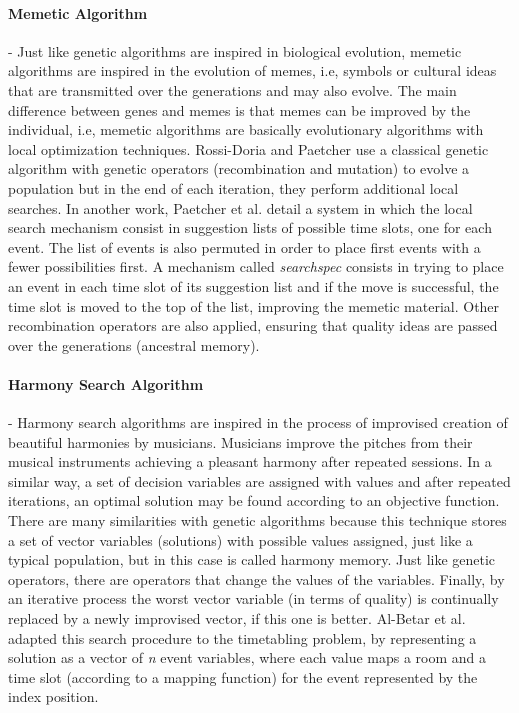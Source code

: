 \paragraph{\textbf{Memetic Algorithm}} - Just like genetic algorithms are inspired in biological evolution, memetic algorithms are inspired in the evolution of memes, i.e, symbols or cultural ideas that are transmitted over the generations and may also evolve. The main difference between genes and memes is that memes can be improved by the individual, i.e, memetic algorithms are basically evolutionary algorithms with local optimization techniques. Rossi-Doria and Paetcher \citep{rossi2004memetic} use a classical genetic algorithm with genetic operators (recombination and mutation) to evolve a population but in the end of each iteration, they perform additional local searches. In another work, Paetcher et al. \citep{paechter1996extensions} detail a system in which the local search mechanism consist in suggestion lists of possible time slots, one for each event. The list of events is also permuted in order to place first events with a fewer possibilities first. A mechanism called \textit{searchspec} consists in trying to place an event in each time slot of its suggestion list and if the move is successful, the time slot is moved to the top of the list, improving the memetic material. Other recombination operators are also applied, ensuring that quality ideas are passed over the generations (ancestral memory). 

\paragraph{\textbf{Harmony Search Algorithm}} - Harmony search algorithms are inspired in the process of improvised creation of beautiful harmonies by musicians. Musicians improve the pitches from their musical instruments achieving a pleasant harmony after repeated sessions. In a similar way, a set of decision variables are assigned with values and after repeated iterations, an optimal solution may be found according to an objective function. There are many similarities with genetic algorithms because this technique stores a set of vector variables (solutions) with possible values assigned, just like a typical population, but in this case is called harmony memory. Just like genetic operators, there are operators that change the values of the variables. Finally, by an iterative process the worst vector variable (in terms of quality) is continually replaced by a newly improvised vector, if this one is better. Al-Betar et al.\citep{al2012university} adapted this search procedure to the timetabling problem, by representing a solution as a vector of \textit{n} event variables, where each value maps a room and a time slot (according to a mapping function) for the event represented by the index position. 

